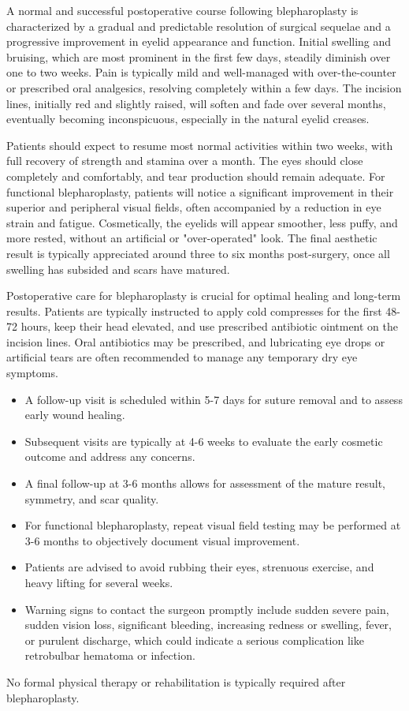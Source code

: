 A normal and successful postoperative course following blepharoplasty is characterized by a gradual and predictable resolution of surgical sequelae and a progressive improvement in eyelid appearance and function. Initial swelling and bruising, which are most prominent in the first few days, steadily diminish over one to two weeks. Pain is typically mild and well-managed with over-the-counter or prescribed oral analgesics, resolving completely within a few days. The incision lines, initially red and slightly raised, will soften and fade over several months, eventually becoming inconspicuous, especially in the natural eyelid creases.

Patients should expect to resume most normal activities within two weeks, with full recovery of strength and stamina over a month. The eyes should close completely and comfortably, and tear production should remain adequate. For functional blepharoplasty, patients will notice a significant improvement in their superior and peripheral visual fields, often accompanied by a reduction in eye strain and fatigue. Cosmetically, the eyelids will appear smoother, less puffy, and more rested, without an artificial or "over-operated" look. The final aesthetic result is typically appreciated around three to six months post-surgery, once all swelling has subsided and scars have matured.

Postoperative care for blepharoplasty is crucial for optimal healing and long-term results. Patients are typically instructed to apply cold compresses for the first 48-72 hours, keep their head elevated, and use prescribed antibiotic ointment on the incision lines. Oral antibiotics may be prescribed, and lubricating eye drops or artificial tears are often recommended to manage any temporary dry eye symptoms.

\begin{itemize}
  \item A follow-up visit is scheduled within 5-7 days for suture removal and to assess early wound healing.
  \item Subsequent visits are typically at 4-6 weeks to evaluate the early cosmetic outcome and address any concerns.
  \item A final follow-up at 3-6 months allows for assessment of the mature result, symmetry, and scar quality.
  \item For functional blepharoplasty, repeat visual field testing may be performed at 3-6 months to objectively document visual improvement.
  \item Patients are advised to avoid rubbing their eyes, strenuous exercise, and heavy lifting for several weeks.
  \item Warning signs to contact the surgeon promptly include sudden severe pain, sudden vision loss, significant bleeding, increasing redness or swelling, fever, or purulent discharge, which could indicate a serious complication like retrobulbar hematoma or infection.
\end{itemize}
No formal physical therapy or rehabilitation is typically required after blepharoplasty.

